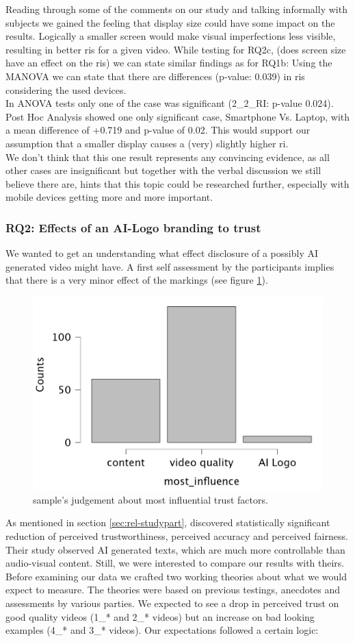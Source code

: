 \documentclass[
  a4paper,  %
  twoside,  %
  bibliography=totoc,
  headsepline,
  cleardoublepage=empty,
  parskip=half,
  draft=false
]{scrbook}
\begin{document}
Reading through some of the comments on our study and talking informally with subjects we gained the feeling that display size could have some impact on the results. Logically a smaller screen would make visual imperfections less visible, resulting in better \gls{ri}s for a given video. While testing for RQ2c, (does screen size have an effect on the \gls{ri}s) we can state similar findings as for RQ1b: Using the MANOVA we can state that there are differences (p-value: 0.039) in \gls{ri}s considering the used devices. \\
In ANOVA tests only one of the case was significant (2\_2\_RI: p-value 0.024). Post Hoc Analysis showed one only significant case, Smartphone Vs. Laptop, with a mean difference of +0.719 and p-value of 0.02. This would support our assumption that a smaller display causes a (very) slightly higher \gls{ri}. \\
We don't think that this one result represents any convincing evidence, as all other cases are insignificant but together with the verbal discussion we still believe there are, hints that this topic could be researched further, especially with mobile devices getting more and more important.


\subsubsection{RQ2: Effects of an AI-Logo branding to trust}
We wanted to get an understanding what effect disclosure of a possibly AI generated video might have. A first self assessment by the participants implies that there is a very minor effect of the markings (see figure \ref{fig:most-influence}).
\begin{figure}[h]
  \centering
  \includegraphics[width=.5\textwidth]{graphics/images/statistics/most-influence.png}
  \caption{sample's judgement about most influential trust factors.}
  \label{fig:most-influence}
\end{figure}
As mentioned in section \ref{sec:rel-studypart},  discovered statistically significant reduction of perceived trustworthiness, perceived accuracy and perceived fairness. Their study observed AI generated texts, which are much more controllable than audio-visual content. Still, we were interested to compare our results with theirs. \\
Before examining our data we crafted two working theories about what we would expect to measure. The theories were based on previous testings, anecdotes and assessments by various parties. We expected to see a drop in perceived trust on good quality videos (1\_* and 2\_* videos) but an increase on bad looking examples (4\_* and 3\_* videos). Our expectations followed a certain logic:
\end{document}
